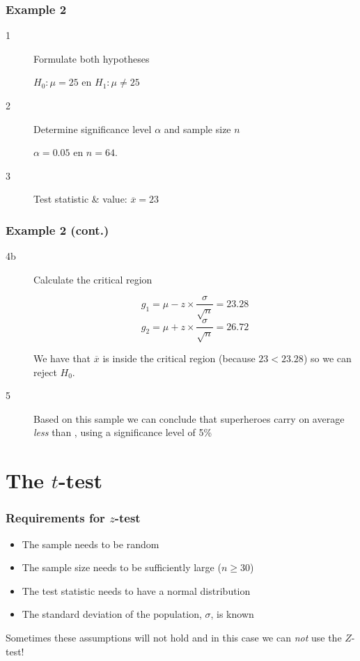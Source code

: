 \documentclass[aspectratio=169]{beamer}
\begin{document}
\begin{frame}
  \frametitle{Example 2}
  
  \begin{description}
    \item[1] Formulate both hypotheses
    
    $H_{0} : \mu = 25$ en $H_{1}: \mu \neq 25$
    
    \item[2] Determine significance level $\alpha$ and sample size $n$
    
    $\alpha = 0.05$ en $n=64$.
    
    \item[3] Test statistic \& value: $\overline{x} = 23$
  \end{description}
  
\end{frame}

\begin{frame}
  \frametitle{Example 2 (cont.)}
  
  \begin{description}
    \item[4b] Calculate the critical region
    
    \[ g_{1} = \mu - z \times \frac{\sigma}{\sqrt{n}} = 23.28 \]
    \[ g_{2} = \mu + z \times \frac{\sigma}{\sqrt{n}} = 26.72 \]
    
    We have that $\overline{x}$ is inside the critical region (because $23 < 23.28$) so we can reject $H_{0}$.
    \item[5] Based on this sample we can conclude that superheroes carry on average \textit{less} than , using a significance level of 5\%
  \end{description}
\end{frame}

\section{The $t$-test}

\begin{frame}
  \frametitle{Requirements for $z$-test}
  
  
  \begin{itemize}
    \item The sample needs to be random
    \item The sample size needs to be sufficiently large ($n \ge 30$)
    \item The test statistic needs to have a normal distribution
    \item The standard deviation of the population, $\sigma$, is known
  \end{itemize}
  
  Sometimes these assumptions will not hold and in this case we can \emph{not} use the $Z$-test!
\end{frame}
\end{document}
